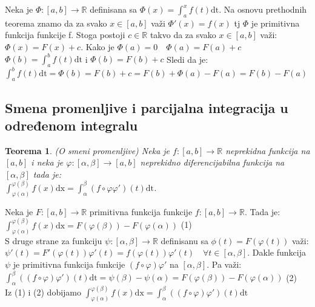 \documentclass{article}
\newtheorem{teorema}{Teorema}[section]
\begin{document}
Neka je $\Phi: [a, b] \rightarrow \mathbb{R}$ definisana sa $\Phi(x) = \displaystyle\int^x_a f(t)\text{dt}$. Na osnovu prethodnih teorema znamo da za svako $x\in [a, b]$ važi $\Phi'(x) = f(x)$ tj $\Phi$ je primitivna funkcija funkcije f. Stoga postoji $c \in \mathbb{R}$ takvo da za svako $x \in [a, b]$ važi:\\
$\Phi(x) = F(x) + c$. Kako je $\Phi(a) = 0\quad \Phi(a) = F(a) +c$\\
$\Phi(b) = \displaystyle\int^b_a f(t)\text{dt}$ i $\Phi(b) = F(b) + c$ Sledi da je:\\
$\displaystyle\int^b_a f(t)\text{dt} = \Phi(b) = F(b) + c = F(b) + \Phi(a) - F(a) = F(b) - F(a)$
\subsection{Smena promenljive i parcijalna integracija u određenom integralu}
\begin{teoremabox}
    \begin{teorema}
        (O smeni promenljive) Neka je $f:[a, b]\rightarrow \mathbb{R}$ neprekidna funkcija na $[a,b]$ i neka je $\varphi: [\alpha, \beta] \rightarrow [a, b]$ neprekidno diferencijabilna funkcija na $[\alpha, \beta]$ tada je:\\
        $\displaystyle \int^{\varphi(\beta)}_{\varphi(\alpha)} f(x)\text{dx} = \int^\beta_\alpha (f\circ\varphi\varphi')(t)\text{dt}$.
    \end{teorema}
\end{teoremabox}
Neka je $F:[a,b]\rightarrow \mathbb{R}$ primitivna funkcija funkcije $f:[a,b]\rightarrow\mathbb{R}$. Tada je:\\
$\displaystyle\int^{\varphi(\beta)}_{\varphi(\alpha)}f(x)\text{dx} = F(\varphi(\beta))-F(\varphi(\alpha))$ (1)\\
S druge strane za funkciju $\psi:[\alpha,\beta]\rightarrow\mathbb{R}$ definisanu sa $\phi(t) = F(\varphi(t))$ važi: \\
$\psi'(t) = F'(\varphi(t))\varphi'(t) = f(\varphi(t))\varphi'(t)\quad\forall t\in[\alpha, \beta]$. Dakle funkcija $\psi$ je primitivna funkcija funkcije $(f\circ\varphi)\varphi'$ na $[\alpha,\beta]$. Pa važi:\\
$\displaystyle\int^\beta_\alpha ((f\circ\varphi)\varphi')(t)\text{dt} = \psi(\beta) - \psi(\alpha) = F(\varphi(\beta)) - F(\varphi(\alpha))$ (2)\\
Iz (1) i (2) dobijamo $\displaystyle\int^{\varphi(\beta)}_{\varphi(\alpha)} f(x)\text{dx} = \int^\beta_\alpha ((f\circ\varphi)\varphi')(t)\text{dt}$
\end{document}

